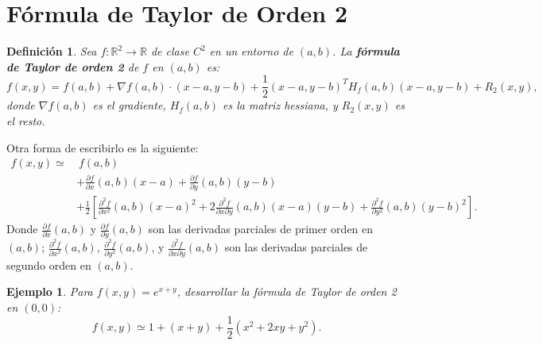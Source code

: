 \documentclass[11pt]{book}
\theoremstyle{definicion}
\newtheorem{definicion}{Definición}[section]
\theoremstyle{teorema}
\theoremstyle{ejemplo}
\newtheorem{ejemplo}{Ejemplo}[section]
\begin{document}
\section{Fórmula de Taylor de Orden 2}

\begin{definicion}
    Sea \( f: \mathbb{R}^2 \to \mathbb{R} \) de clase \( C^2 \) en un entorno de \( (a, b) \). La \textbf{fórmula de Taylor de orden 2} de \( f \) en \( (a, b) \) es:
    \[
    f(x, y) = f(a, b) + \nabla f(a, b) \cdot (x - a, y - b) + \frac{1}{2} (x - a, y - b)^T H_f(a, b) (x - a, y - b) + R_2(x, y),
    \]
    donde \( \nabla f(a, b) \) es el gradiente, \( H_f(a, b) \) es la matriz hessiana, y \( R_2(x, y) \) es el resto.
\end{definicion}

\noindent
Otra forma de escribirlo es la siguiente:
\[
\begin{aligned}
f(x, y) \simeq & \ f(a, b) \\
& + \frac{\partial f}{\partial x}(a, b)(x - a) + \frac{\partial f}{\partial y}(a, b)(y - b) \\
& + \frac{1}{2} \left[ \frac{\partial^2 f}{\partial x^2}(a, b)(x - a)^2 + 2 \frac{\partial^2 f}{\partial x \partial y}(a, b)(x - a)(y - b) + \frac{\partial^2 f}{\partial y^2}(a, b)(y - b)^2 \right].
\end{aligned}
\]
Donde
 \( \frac{\partial f}{\partial x}(a, b) \) y \( \frac{\partial f}{\partial y}(a, b) \) son las derivadas parciales de primer orden en \( (a, b) \);
\( \frac{\partial^2 f}{\partial x^2}(a, b) \), \( \frac{\partial^2 f}{\partial y^2}(a, b) \), y \( \frac{\partial^2 f}{\partial x \partial y}(a, b) \) son las derivadas parciales de segundo orden en \( (a, b) \).


\begin{ejemplo}
    Para \( f(x, y) = e^{x + y} \), desarrollar la fórmula de Taylor de orden 2 en \( (0, 0) \):
    \[
    f(x, y) \simeq 1 + (x + y) + \frac{1}{2}(x^2 + 2xy + y^2).
    \]
\end{ejemplo}

\end{document}

